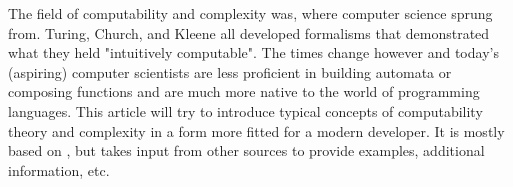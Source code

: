 The field of computability and complexity was, where computer science sprung 
from. Turing, Church, and Kleene all developed formalisms that demonstrated 
what they held "intuitively computable". The times change however and today's 
(aspiring) computer scientists are less proficient in building automata or 
composing functions and are much more native to the world of programming 
languages. This article will try to introduce typical concepts of 
computability theory and complexity in a form more fitted for a modern developer.
It is mostly based on \cite{jones}, but takes input from other sources to 
provide examples, additional information, etc.
